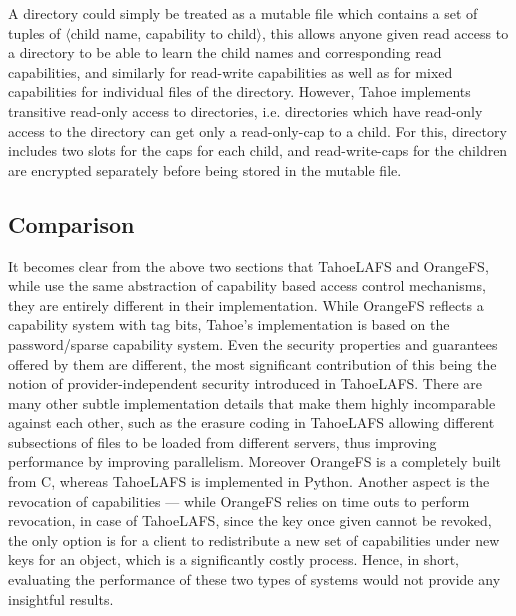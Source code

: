 A directory could simply be treated as a mutable file which contains a set of tuples of $\langle$child name, capability to child$\rangle$, this allows anyone given read access to a directory to be able to learn the child names and corresponding read capabilities, and similarly for read-write capabilities as well as for mixed capabilities for individual files of the directory. However, Tahoe implements transitive read-only access to directories, i.e. directories which have read-only access to the directory can get only a read-only-cap to a child. For this, directory includes two slots for the caps for each child, and read-write-caps for the children are encrypted separately before being stored in the mutable file.

\subsection{Comparison}
It becomes clear from the above two sections that TahoeLAFS and OrangeFS, while use the same abstraction of capability based access control mechanisms, they are entirely different in their implementation. While OrangeFS reflects a capability system with tag bits, Tahoe's implementation is based on the password/sparse capability system. Even the security properties and guarantees offered by them are different, the most significant contribution of this being the notion of provider-independent security introduced in TahoeLAFS. There are many other subtle implementation details that make them highly incomparable against each other, such as the erasure coding in TahoeLAFS allowing different subsections of files to be loaded from different servers, thus improving performance by improving parallelism. Moreover OrangeFS is a completely built from C, whereas TahoeLAFS is implemented in Python. Another aspect is the revocation of capabilities --- while OrangeFS relies on time outs to perform revocation, in case of TahoeLAFS, since the key once given cannot be revoked, the only option is for a client to redistribute a new set of capabilities under new keys for an object, which is a significantly costly process. Hence, in short, evaluating the performance of these two types of systems would not provide any insightful results.



